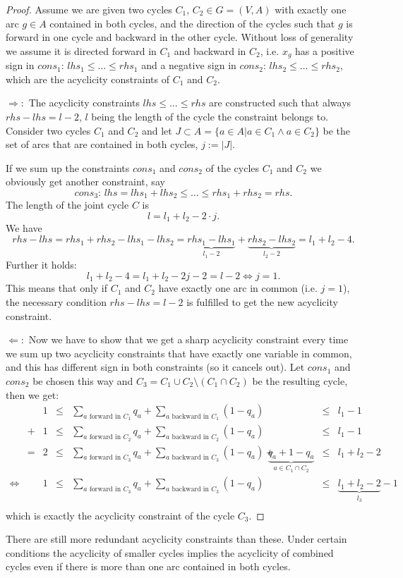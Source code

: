 \begin{proof}
 Assume we are given two cycles $C_1,\,C_2\in G=(V,A)$ with exactly one arc $g\in A$ 
contained in both cycles, and the direction of the cycles such that $g$ is forward in one cycle and backward in the 
other cycle. Without loss of generality we assume it is directed forward in $C_1$ and backward in $C_2$, i.e. $x_g$ has 
a positive sign in $cons_1:\,lhs_1\le \dots\le rhs_1$ and a negative sign in $cons_2:\, lhs_2\le \dots\le rhs_2$, which 
are the acyclicity constraints of $C_1$ and $C_2$. 

$\Rightarrow :$ 
The acyclicity constraints $lhs \le \dots\le rhs$ are constructed such that always $rhs-lhs=l-2$, $l$ being the length 
of the cycle the constraint belongs to. Consider two cycles $C_1$ and $C_2$ and let $J\subset A=\{a\in A|a\in C_1 
\land a\in C_2 \}$ be the set of arcs that are contained in both cycles, $j:=|J|$. 

If we sum up the constraints $cons_1$ and $cons_2$ of the cycles $C_1$ and $C_2$ we obviously get another constraint,
say $$cons_3:\, lhs=lhs_1+lhs_2\le\dots\le rhs_1+rhs_2=rhs.$$ The length of the joint cycle $C$ is 
$$l=l_1+l_2-2\cdot j.$$ 
We have 
$$rhs-lhs=rhs_1+rhs_2-lhs_1-lhs_2=\underbrace{rhs_1-lhs_1}_{l_1-2}+\underbrace{rhs_2-lhs_2}_{l_2-2}=l_1+l_2-4.$$
Further it holds:
$$l_1+l_2-4=l_1+l_2-2j-2=l-2 \iff j=1.$$ 
This means that only if $C_1$ and $C_2$ have exactly one arc in common (i.e. $j=1$), the necessary condition 
$rhs-lhs=l-2$ is fulfilled to get the new acyclicity constraint.

$\Leftarrow :$ Now we have to show that we get a sharp acyclicity constraint every time we sum up two acyclicity 
constraints that have exactly one variable in common, and this has different sign in both constraints (so it cancels 
out). Let $cons_1$ and $cons_2$ be chosen this way and $C_3=C_1\cup C_2\setminus (C_1\cap C_2)$ be the resulting cycle, 
then we get:
\begin{align*}
 &&1&\le &\sum_{a \textrm{ forward in }C_1}q_a + \sum_{a\textrm{ backward in }C_1}{(1-q_a)}&&\le &l_1-1\\
 &+&1&\le &\sum_{a \textrm{ forward in }C_2}q_a + \sum_{a\textrm{ backward in }C_2}{(1-q_a)}&&\le &l_1-1\\
 &=&2&\le &\sum_{a \textrm{ forward in }C_3}q_a +\sum_{a\textrm{ backward in }C_3}{(1-q_a)}+
 &\underbrace{q_a+1-q_a}_{a\in C_1\cap C_2} &\le &l_1+l_2-2\\
 \iff &&1&\le &\sum_{a \textrm{ forward in }C_3}q_a +\sum_{a\textrm{ backward in }C_3}{(1-q_a)}
 &&\le &\underbrace{l_1+l_2-2}_{l_3}-1\\
\end{align*}
which is exactly the acyclicity constraint of the cycle $C_3$.
\end{proof}
There are still more redundant acyclicity constraints than these. Under certain conditions the acyclicity of smaller 
cycles implies the acyclicity of combined cycles even if there is more than one arc contained in both cycles.

